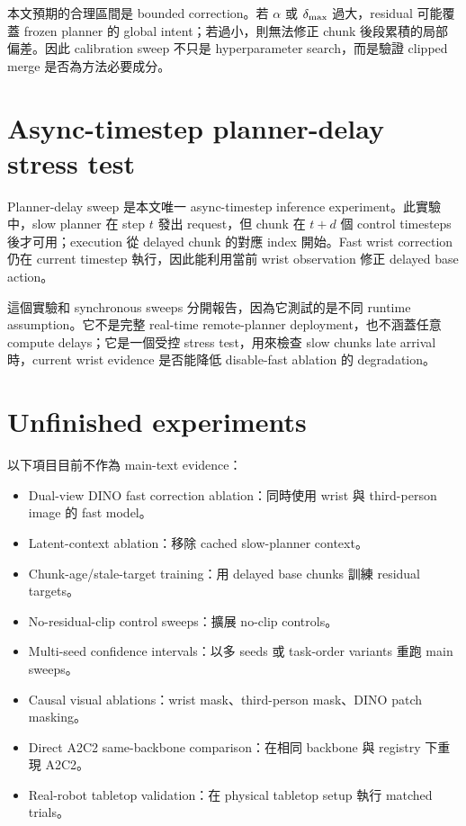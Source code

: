 本文預期的合理區間是 bounded correction。若 $\alpha$ 或 $\delta_{\max}$ 過大，residual 可能覆蓋 frozen planner 的 global intent；若過小，則無法修正 chunk 後段累積的局部偏差。因此 calibration sweep 不只是 hyperparameter search，而是驗證 clipped merge 是否為方法必要成分。

\section{Async-timestep planner-delay stress test}

Planner-delay sweep 是本文唯一 async-timestep inference experiment。此實驗中，slow planner 在 step $t$ 發出 request，但 chunk 在 $t+d$ 個 control timesteps 後才可用；execution 從 delayed chunk 的對應 index 開始。Fast wrist correction 仍在 current timestep 執行，因此能利用當前 wrist observation 修正 delayed base action。

這個實驗和 synchronous sweeps 分開報告，因為它測試的是不同 runtime assumption。它不是完整 real-time remote-planner deployment，也不涵蓋任意 compute delays；它是一個受控 stress test，用來檢查 slow chunks late arrival 時，current wrist evidence 是否能降低 disable-fast ablation 的 degradation。

\section{Unfinished experiments}

以下項目目前不作為 main-text evidence：

\begin{itemize}
  \item Dual-view DINO fast correction ablation：同時使用 wrist 與 third-person image 的 fast model。
  \item Latent-context ablation：移除 cached slow-planner context。
  \item Chunk-age/stale-target training：用 delayed base chunks 訓練 residual targets。
  \item No-residual-clip control sweeps：擴展 no-clip controls。
  \item Multi-seed confidence intervals：以多 seeds 或 task-order variants 重跑 main sweeps。
  \item Causal visual ablations：wrist mask、third-person mask、DINO patch masking。
  \item Direct A2C2 same-backbone comparison：在相同 \smolvla{} backbone 與 registry 下重現 A2C2。
  \item Real-robot tabletop validation：在 physical tabletop setup 執行 matched trials。
\end{itemize}
